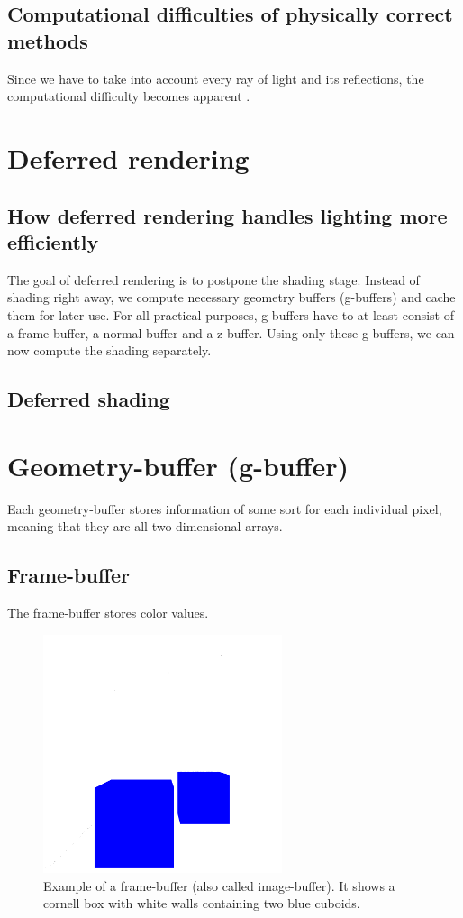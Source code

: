 \documentclass{ACGSeminar}
\begin{document}
	\subsection{Computational difficulties of physically correct methods}
	Since we have to take into account every ray of light and its reflections, the computational difficulty becomes apparent \cite{DST}.

\section{Deferred rendering}
	\subsection{How deferred rendering handles lighting more efficiently}
		The goal of deferred rendering is to postpone the shading stage. %
		Instead of shading right away, we compute necessary geometry buffers (g-buffers) and cache 
		them for later use. For all practical purposes, g-buffers have to at least consist of a frame-buffer, a normal-buffer and a z-buffer. Using only these g-buffers, 
		we can now compute the shading separately.
	\subsection{Deferred shading}

\section{Geometry-buffer (g-buffer)}
	Each geometry-buffer stores information of some sort for each individual pixel, meaning that they are all two-dimensional arrays.
	\subsection{Frame-buffer}%
		The frame-buffer stores color values.%
		\begin{figure}[htb!]%
			\begin{center}%
				\includegraphics[width=7cm]{img/frame_buffer.png}
			\end{center}%
			\caption{Example of a frame-buffer (also called image-buffer). It shows a cornell box with white walls containing two blue cuboids.}%
			\label{fig:frame_buffer}%
		\end{figure}%
\end{document}

